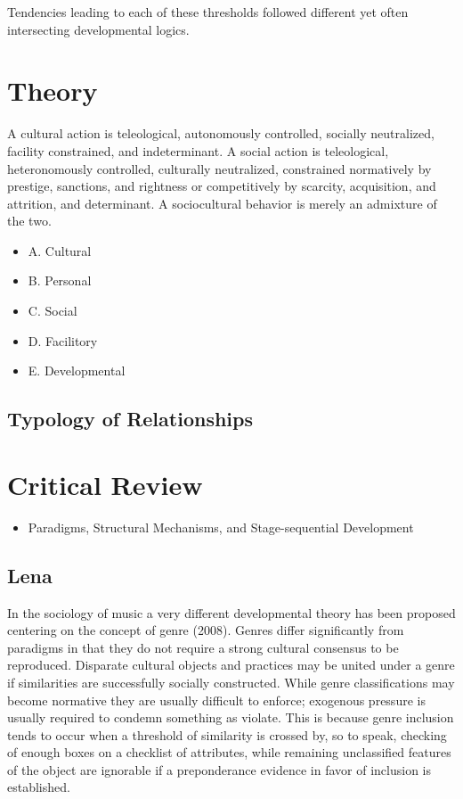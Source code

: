 Tendencies leading to each of these thresholds followed different yet
often intersecting developmental logics.

\section{Theory}\label{theory}

A cultural action is teleological, autonomously controlled, socially
neutralized, facility constrained, and indeterminant. A social action is
teleological, heteronomously controlled, culturally neutralized,
constrained normatively by prestige, sanctions, and rightness or
competitively by scarcity, acquisition, and attrition, and determinant.
A sociocultural behavior is merely an admixture of the two.

\begin{itemize}
\tightlist
\item
  A. Cultural
\item
  B. Personal
\item
  C. Social
\item
  D. Facilitory
\item
  E. Developmental
\end{itemize}

\subsection{Typology of Relationships}\label{typology-of-relationships}

\section{Critical Review}\label{critical-review}

\begin{itemize}
\tightlist
\item
  Paradigms, Structural Mechanisms, and Stage-sequential Development
\end{itemize}

\subsection{Lena}\label{lena}

In the sociology of music a very different developmental theory has been
proposed centering on the concept of genre (2008). Genres differ
significantly from paradigms in that they do not require a strong
cultural consensus to be reproduced. Disparate cultural objects and
practices may be united under a genre if similarities are successfully
socially constructed. While genre classifications may become normative
they are usually difficult to enforce; exogenous pressure is usually
required to condemn something as violate. This is because genre
inclusion tends to occur when a threshold of similarity is crossed by,
so to speak, checking of enough boxes on a checklist of attributes,
while remaining unclassified features of the object are ignorable if a
preponderance evidence in favor of inclusion is established.

